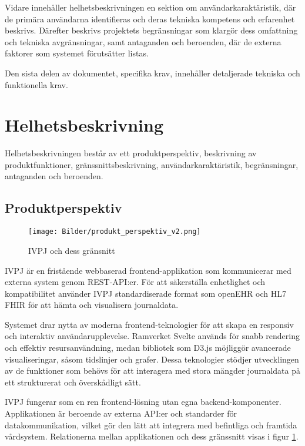 \documentclass{article}
\begin{document}
Vidare innehåller helhetsbeskrivningen en sektion om användarkaraktäristik, där de primära användarna identifieras och deras tekniska kompetens och erfarenhet beskrivs. Därefter beskrivs projektets begränsningar som klargör dess omfattning och tekniska avgränsningar, samt antaganden och beroenden, där de externa faktorer som systemet förutsätter listas.

Den sista delen av dokumentet, specifika krav, innehåller detaljerade tekniska och funktionella krav.

\section{Helhetsbeskrivning}
Helhetsbeskrivningen består av ett produktperspektiv, beskrivning av produktfunktioner, gränssnittsbeskrivning, användarkaraktäristik, begränsningar, antaganden och beroenden. 

\subsection{Produktperspektiv}

\begin{figure}[h]
    \centering
    \texttt{[image: Bilder/produkt\_perspektiv\_v2.png]}
    \caption{IVPJ och dess gränsnitt}
    \label{fig:gr}
\end{figure}

IVPJ är en fristående webbaserad frontend-applikation som kommunicerar med externa system genom REST-API:er. För att säkerställa enhetlighet och kompatibilitet använder IVPJ standardiserade format som openEHR och HL7 FHIR för att hämta och visualisera journaldata.

Systemet drar nytta av moderna frontend-teknologier för att skapa en responsiv och interaktiv användarupplevelse. Ramverket Svelte används för snabb rendering och effektiv resursanvändning, medan bibliotek som D3.js möjliggör avancerade visualiseringar, såsom tidslinjer och grafer. Dessa teknologier stödjer utvecklingen av de funktioner som behövs för att interagera med stora mängder journaldata på ett strukturerat och överskådligt sätt.

IVPJ fungerar som en ren frontend-lösning utan egna backend-komponenter. Applikationen är beroende av externa API:er och standarder för datakommunikation, vilket gör den lätt att integrera med befintliga och framtida vårdsystem. Relationerna mellan applikationen och dess gränssnitt visas i figur \ref{fig:gr}.
\end{document}
